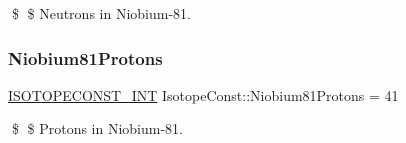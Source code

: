 \$ \$ Neutrons in Niobium-\/81. \mbox{\label{group___isotope_const-_niobium-_nb81_ga4aeb4c9d6d6ab2dd8acab50e718a4a3a}} 
\subsubsection{\texorpdfstring{Niobium81\+Protons}{Niobium81Protons}}
{\footnotesize\ttfamily \mbox{\hyperlink{group___isotope_const-_macros_ga5f18360b3e99483a35c32d789e62621c}{I\+S\+O\+T\+O\+P\+E\+C\+O\+N\+S\+T\+\_\+\+I\+NT}} Isotope\+Const\+::\+Niobium81\+Protons = 41}

\$ \$ Protons in Niobium-\/81. 